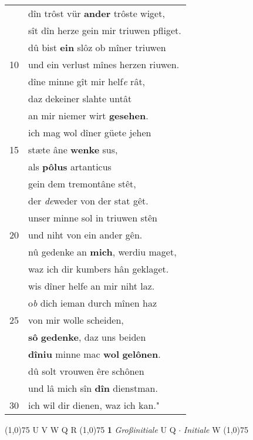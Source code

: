 \documentclass[8pt,a4paper,notitlepage]{article}
\begin{document}
\begin{table}[ht]
\begin{minipage}[t]{0.5\linewidth}
\begin{tabular}{rl}
 & dîn trôst vür \textbf{ander} trôste wiget,\\ 
 & sît dîn herze gein mir triuwen pfliget.\\ 
 & dû bist \textbf{ein} slôz ob mîner triuwen\\ 
10 & und ein verlust mînes herzen riuwen.\\ 
 & dîne minne gît mir helf\textit{e} rât,\\ 
 & daz dekeiner slahte untât\\ 
 & an mir niemer wirt \textbf{gesehen}.\\ 
 & ich mag wol dîner güete jehen\\ 
15 & stæte âne \textbf{wenke} sus,\\ 
 & als \textbf{pôlus} artanticus\\ 
 & gein dem tremontâne stêt,\\ 
 & der \textit{de}weder von der stat gêt.\\ 
 & unser minne sol in triuwen stên\\ 
20 & und niht von ein ander gên.\\ 
 & nû gedenke an \textbf{mich}, werdiu maget,\\ 
 & waz ich dir kumbers hân geklaget.\\ 
 & wis dîner helfe an mir niht laz.\\ 
 & o\textit{b} dich ieman durch mînen haz\\ 
25 & von mir wolle scheiden,\\ 
 & \textbf{sô} \textbf{gedenke}, daz uns beiden\\ 
 & \textbf{dîniu} minne mac \textbf{wol} \textbf{gelônen}.\\ 
 & dû solt vrouwen êre schônen\\ 
 & und lâ mich sîn \textbf{dîn} dienstman.\\ 
30 & ich wil dir dienen, waz ich kan."\\ 
\end{tabular}
\scriptsize
\line(1,0){75} \newline
U V W Q R \newline
\line(1,0){75} \newline
\textbf{1} \textit{Großinitiale} U Q   $\cdot$ \textit{Initiale} W  \newline
\line(1,0){75} \newline

\end{minipage}
\end{table}
\end{document}
